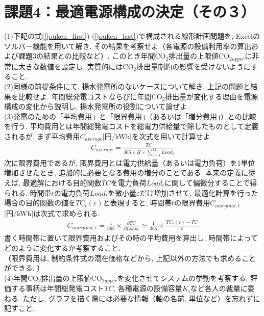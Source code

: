 \documentclass[]{jsarticle}
\begin{document}
\section{課題4：最適電源構成の決定（その３）}
  \begin{screen}
    (1)下記の式(\ref{jouken_first})-(\ref{jouken_last})で構成される線形計画問題を, Excelのソルバー機能を用いて解き, その結果を考察せよ（各電源の設備利用率の算出および課題3の結果との比較など）. このとき年間CO$_2$排出量の上限値CO$_{2upper}$に非常に大きな数値を設定し, 実質的にはCO$_2$排出量制約の影響を受けないようにすること. \\
    (2)同様の前提条件にて, 揚水発電所のないケースについて解き, 上記の問題と結果を比較せよ. 年間総発電コストならびに年間CO$_2$排出量が変化する理由を電源構成の変化から説明し, 揚水発電所の役割について論ぜよ. \\
    (3)発電のための「平均費用」と「限界費用」（あるいは「増分費用」）との比較を行う. 平均費用とは年間総発電コストを総電力供給量で除したものとして定義されるが, まず平均費用$C_{average}$[円/kWh]を次式を用いて計算せよ.
      \begin{eqnarray}
        \label{Cave}
        C_{average} = \frac{TC}{365 \times H \times \sum_{t = 1}^{24} Load_t}
      \end{eqnarray}
    次に限界費用であるが, 限界費用とは電力供給量（あるいは電力負荷）を1単位増加させたとき, 追加的に必要となる費用の増分のことである. 本来の定義に従えば, 最適解における目的関数$TC$を電力負荷$Load_t$に関して偏微分することで得られる. 時間帯$t$の電力負荷$Load_t$を微小量$\varepsilon$だけ増加させて, 最適化計算を行った場合の目的関数の値を$TC_t(\varepsilon)$と表現すると, 時間帯$t$の限界費用$C_{marginal,t}$[円/kWh]は次式で求められる.
      \begin{eqnarray}
        C_{marginal,t} = \frac{1}{365} \times \frac{\partial TC}{\partial Load_t} \simeq \frac{1}{365} \times \frac{TC_t(\varepsilon)-TC}{\varepsilon}
      \end{eqnarray}
    書く時間帯に置いて限界費用およびその時の平均費用を算出し, 時間帯によってどのように変化するか考察すること. \\
    （限界費用は, 制約条件式の潜在価格などから, 上記以外の方法でも求めることができる. ）\\
    (4)年間CO$_2$排出量の上限値CO$_{2upper}$を変化させてシステムの挙動を考察する. 評価する事柄は年間総発電コスト$TC$, 各種電源の設備容量$K_i$など各人の裁量に委ねる. ただし, グラフを描く際には必要な情報（軸の名前, 単位など）を忘れずに記すこと.
  \end{screen}
\end{document}
